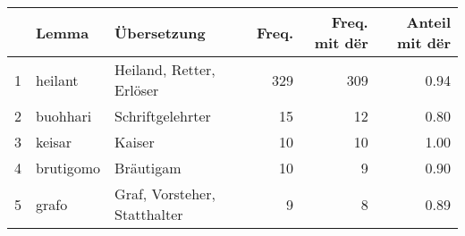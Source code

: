 \begin{tabular}{rllrrr}
  \hline
 & Lemma & Übersetzung & Freq. & Freq. mit dër & Anteil mit dër \\ 
  \hline
1 & heilant & Heiland, Retter, Erlöser & 329 & 309 & 0.94 \\ 
  2 & buohhari & Schriftgelehrter &  15 &  12 & 0.80 \\ 
  3 & keisar & Kaiser &  10 &  10 & 1.00 \\ 
  4 & brutigomo & Bräutigam &  10 &   9 & 0.90 \\ 
  5 & grafo & Graf, Vorsteher, Statthalter &   9 &   8 & 0.89 \\ 
   \hline
\end{tabular}
